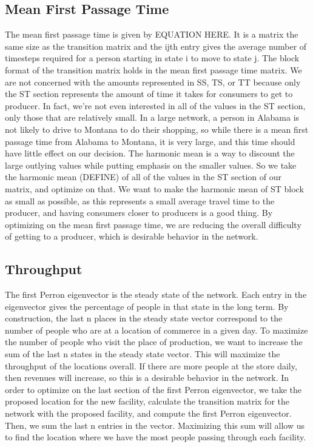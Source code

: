 \documentclass[twoside,twocolumn]{article}
\begin{document}
\subsection{Mean First Passage Time}
The mean first passage time is given by EQUATION HERE.
It is a matrix the same size as the transition matrix and the ijth entry gives the average number of timesteps required for a person starting in state i to move to state j.
The block format of the transition matrix holds in the mean first passage time matrix.
We are not concerned with the amounts represented in SS, TS, or TT because only the ST section represents the amount of time it takes for consumers to get to producer.
In fact, we're not even interested in all of the values in the ST section, only those that are relatively small.
In a large network, a person in Alabama is not likely to drive to Montana to do their shopping, so while there is a mean first passage time from Alabama to Montana, it is very large, and this time should have little effect on our decision.
The harmonic mean is a way to discount the large outlying values while putting emphasis on the smaller values.
So we take the harmonic mean (DEFINE) of all of the values in the ST section of our matrix, and optimize on that.
We want to make the harmonic mean of ST block as small as possible, as this represents a small average travel time to the producer, and having consumers closer to producers is a good thing.
By optimizing on the mean first passage time, we are reducing the overall difficulty of getting to a producer, which is desirable behavior in the network.

\subsection{Throughput}
The first Perron eigenvector is the steady state of the network. %
Each entry in the eigenvector gives the percentage of people in that state in the long term. %
By construction, the last n places in the steady state vector correspond to the number of people who are at a location of commerce in a given day.
To maximize the number of people who visit the place of production, we want to increase the sum of the last n states in the steady state vector.
This will maximize the throughput of the locations overall.
If there are more people at the store daily, then revenues will increase, so this is a desirable behavior in the network.
In order to optimize on the last section of the first Perron eigenvector, we take the proposed location for the new facility, calculate the transition matrix for the network with the proposed facility, and compute the first Perron eigenvector.
Then, we sum the last n entries in the vector.
Maximizing this sum will allow us to find the location where we have the most people passing through each facility.
\end{document}
